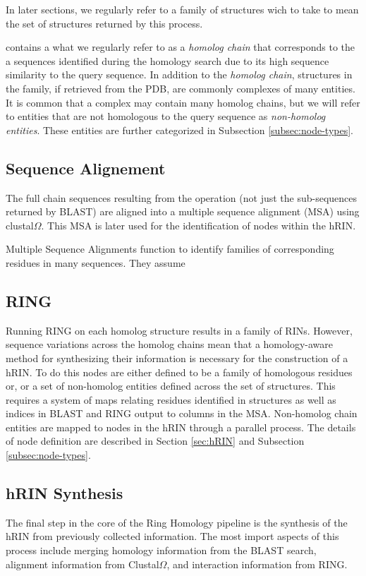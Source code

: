 In later sections, we regularly refer to a family of structures wich to take to mean the set of structures returned by this process. 

 contains a what we regularly refer to as a \emph{homolog chain} that corresponds to the a sequences identified during the homology search due to its high sequence similarity to the query sequence. In addition to the \emph{homolog chain}, structures in the family, if retrieved from the PDB, are commonly complexes of many entities. It is common that a complex may contain many homolog chains, but we will refer to entities that are not homologous to the query sequence as \emph{non-homolog entities}. These entities are further categorized in Subsection \ref{subsec:node-types}.

\subsection{Sequence Alignement}
The full chain sequences resulting from the operation (not just the sub-sequences returned by BLAST) are aligned into a multiple sequence alignment (MSA) using clustal$\Omega$. This MSA is later used for the identification of nodes within the hRIN.

Multiple Sequence Alignments function to identify families of corresponding residues in many sequences.
They assume 

\subsection{RING}
Running RING on each homolog structure results in a family of RINs. However, sequence variations across the homolog chains mean that a homology-aware method for synthesizing their information is necessary for the construction of a hRIN. To do this nodes are either defined to be a family of homologous residues or, or a set of non-homolog entities defined across the set of structures. This requires a system of maps relating residues identified in structures as well as indices in BLAST and RING output to columns in the MSA. Non-homolog chain entities are mapped to nodes in the hRIN through a parallel process. The details of node definition are described in Section \ref{sec:hRIN} and Subsection \ref{subsec:node-types}.

\subsection{hRIN Synthesis} %
The final step in the core of the Ring Homology pipeline is the synthesis of the hRIN from previously collected information. The most import aspects of this process include merging homology information from the BLAST search, alignment information from Clustal$\Omega$, and interaction information from RING.





